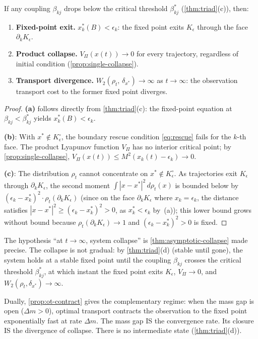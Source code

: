 \begin{theorem}\label{thm:asymptotic-collapse}
If any coupling $\beta_{kj}$ drops below the critical threshold
$\beta_{kj}^*$ (\cref{thm:triad}(c)), then:
\begin{enumerate}[label=(\alph*)]
  \item \textbf{Fixed-point exit.}  $x_k^*(B) < \epsilon_k$:
    the fixed point exits $K_\epsilon$ through the face
    $\partial_k K_\epsilon$.
  \item \textbf{Product collapse.}
    $V_\Pi(x(t)) \to 0$ for every trajectory, regardless of
    initial condition (\cref{prop:single-collapse}).
  \item \textbf{Transport divergence.}
    $W_2(\rho_t,\, \delta_{x^*}) \to \infty$ as $t \to \infty$:
    the observation transport cost to the former fixed point
    diverges.
\end{enumerate}
\end{theorem}

\begin{proof}
\textbf{(a)} follows directly from \cref{thm:triad}(c): the
fixed-point equation at $\beta_{kj} < \beta_{kj}^*$ yields
$x_k^*(B) < \epsilon_k$.

\textbf{(b)}: With $x^* \notin K_\epsilon^\circ$, the boundary
rescue condition \eqref{eq:rescue} fails for the $k$-th face.
The product Lyapunov function $V_\Pi$ has no interior critical
point; by \cref{prop:single-collapse},
$V_\Pi(x(t)) \leq M^2(x_k(t) - \epsilon_k) \to 0$.

\textbf{(c)}: The distribution $\rho_t$ cannot concentrate on
$x^* \notin K_\epsilon^\circ$.  As trajectories exit $K_\epsilon$
through $\partial_k K_\epsilon$, the second moment
$\int |x - x^*|^2\,d\rho_t(x)$ is bounded below by
$(\epsilon_k - x_k^*)^2 \cdot \rho_t(\partial_k K_\epsilon)$
(since on the face $\partial_k K_\epsilon$ where $x_k = \epsilon_k$,
the distance satisfies $|x - x^*|^2 \geq (\epsilon_k - x_k^*)^2 > 0$,
as $x_k^* < \epsilon_k$ by~(a));
this lower bound grows without bound because
$\rho_t(\partial_k K_\epsilon) \to 1$ and $(\epsilon_k - x_k^*)^2 > 0$
is fixed.
\end{proof}

\begin{remark}
\label{rem:collapse-hypo}
The hypothesis ``at $t \to \infty$, system collapse'' is
\cref{thm:asymptotic-collapse} made precise.  The collapse is not
gradual: by \cref{thm:triad}(d) (stable until gone), the system
holds at a stable fixed point until the coupling $\beta_{kj}$
crosses the critical threshold $\beta_{kj}^*$, at which instant the
fixed point exits $K_\epsilon$, $V_\Pi \to 0$, and
$W_2(\rho_t, \delta_{x^*}) \to \infty$.

Dually, \cref{prop:ot-contract} gives the complementary regime:
when the mass gap is open ($\Delta m > 0$), optimal transport
contracts the observation to the fixed point exponentially fast at
rate $\Delta m$.  The mass gap IS the convergence rate.  Its
closure IS the divergence of collapse.  There is no intermediate
state (\cref{thm:triad}(d)).
\end{remark}
